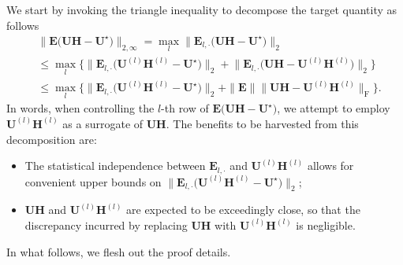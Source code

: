 We start by invoking the triangle inequality to decompose the target quantity as follows
%
\begin{align}
 & \big\|\bm{E}\big(\bm{U}\bm{H}-\bm{U}^{\star}\big)\big\|_{2,\infty}=\max_{l}\big\|\bm{E}_{l,\cdot}\big(\bm{U}\bm{H}-\bm{U}^{\star}\big)\big\|_{2}\nonumber \\
 & \leq\max_{l}\Big\{\big\|\bm{E}_{l,\cdot}\big(\bm{U}^{(l)}\bm{H}^{(l)}-\bm{U}^{\star}\big)\big\|_{2}+\big\|\bm{E}_{l,\cdot}\big(\bm{U}\bm{H}-\bm{U}^{(l)}\bm{H}^{(l)}\big)\big\|_{2}\Big\}\nonumber \\
 & \leq\max_{l}\Big\{\big\|\bm{E}_{l,\cdot}\big(\bm{U}^{(l)}\bm{H}^{(l)}-\bm{U}^{\star}\big)\big\|_{2}+\|\bm{E}\| \big\|\bm{U}\bm{H}-\bm{U}^{(l)}\bm{H}^{(l)}\big\|_{\mathrm{F}}\Big\}.
	\label{eq:decomposition-E-UH-Ustar}
\end{align}
%
In words, when controlling the $l$-th row of $\bm{E}\big(\bm{U}\bm{H}-\bm{U}^{\star}\big)$, we attempt to employ $\bm{U}^{(l)}\bm{H}^{(l)}$ as a surrogate of $\bm{U}\bm{H}$.  The benefits to be harvested from this decomposition are:
%
\begin{itemize}
	\item The statistical independence between $\bm{E}_{l,\cdot}$ and $\bm{U}^{(l)}\bm{H}^{(l)}$ allows for convenient upper bounds on $\big\|\bm{E}_{l,\cdot}\big(\bm{U}^{(l)}\bm{H}^{(l)}-\bm{U}^{\star}\big)\big\|_{2}$;
	
	\item  $\bm{U}\bm{H}$ and  $\bm{U}^{(l)}\bm{H}^{(l)}$ are expected to be exceedingly close, so that the discrepancy incurred by replacing $\bm{U}\bm{H}$ with $\bm{U}^{(l)}\bm{H}^{(l)}$ is negligible.
\end{itemize}
%
In what follows, we flesh out the proof details.








